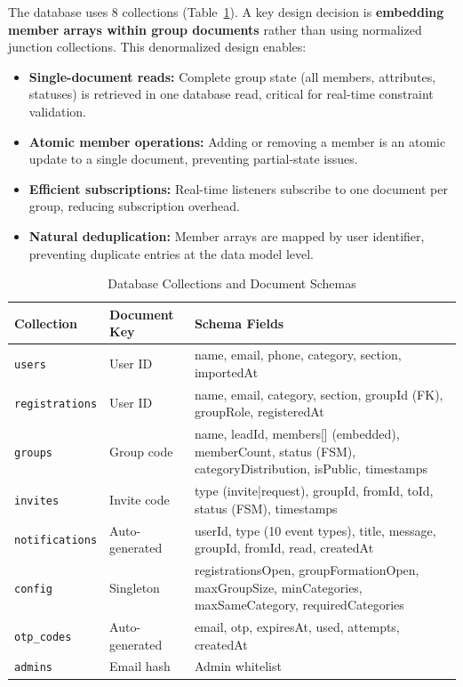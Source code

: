 \documentclass[11pt,a4paper]{article}
\theoremstyle{plain}
\theoremstyle{definition}
\begin{document}
The database uses 8 collections (Table~\ref{tab:collections}). A key design decision is \textbf{embedding member arrays within group documents} rather than using normalized junction collections. This denormalized design enables:

\begin{itemize}[noitemsep,topsep=4pt]
    \item \textbf{Single-document reads:} Complete group state (all members, attributes, statuses) is retrieved in one database read, critical for real-time constraint validation.
    \item \textbf{Atomic member operations:} Adding or removing a member is an atomic update to a single document, preventing partial-state issues.
    \item \textbf{Efficient subscriptions:} Real-time listeners subscribe to one document per group, reducing subscription overhead.
    \item \textbf{Natural deduplication:} Member arrays are mapped by user identifier, preventing duplicate entries at the data model level.
\end{itemize}

\begin{table}[htbp]
\centering
\caption{Database Collections and Document Schemas}
\label{tab:collections}
\small
\renewcommand{\arraystretch}{1.15}
\begin{tabular}{@{}lp{2cm}p{5.5cm}@{}}
\toprule
\textbf{Collection} & \textbf{Document Key} & \textbf{Schema Fields} \\
\midrule
\texttt{users} & User ID & name, email, phone, category, section, importedAt \\
\texttt{registrations} & User ID & name, email, category, section, groupId (FK), groupRole, registeredAt \\
\texttt{groups} & Group code & name, leadId, members[] (embedded), memberCount, status (FSM), categoryDistribution, isPublic, timestamps \\
\texttt{invites} & Invite code & type (invite|request), groupId, fromId, toId, status (FSM), timestamps \\
\texttt{notifications} & Auto-generated & userId, type (10 event types), title, message, groupId, fromId, read, createdAt \\
\texttt{config} & Singleton & registrationsOpen, groupFormationOpen, maxGroupSize, minCategories, maxSameCategory, requiredCategories \\
\texttt{otp\_codes} & Auto-generated & email, otp, expiresAt, used, attempts, createdAt \\
\texttt{admins} & Email hash & Admin whitelist \\
\bottomrule
\end{tabular}
\end{table}
\end{document}
